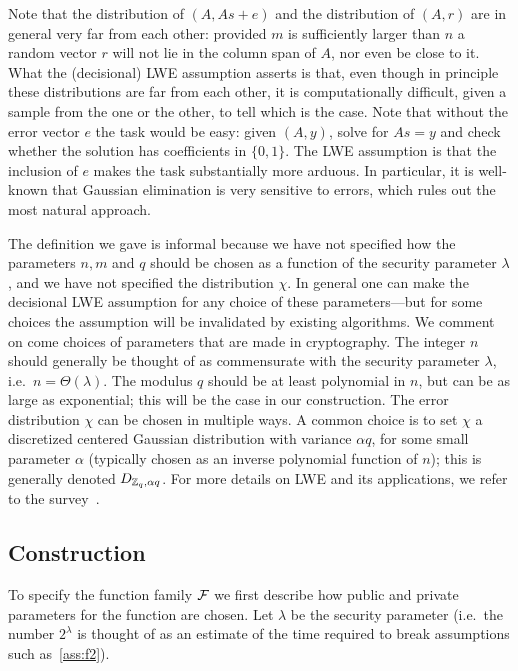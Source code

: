 Note that the distribution of $(A,As+e)$ and the distribution of $(A,r)$ are in general very far from each other: provided $m$ is sufficiently larger than $n$ a random vector $r$ will not lie in the column span of $A$, nor even be close to it. What the (decisional) LWE assumption asserts is that, even though in principle these distributions are far from each other, it is computationally difficult, given a sample from the one or the other, to tell which is the case.  Note that without the error vector $e$ the task would be easy: given $(A,y)$, solve for $As=y$ and check whether the solution has coefficients in $\{0,1\}$. The LWE assumption is that the inclusion of $e$ makes the task substantially more arduous. In particular, it is well-known that Gaussian elimination is very sensitive to errors, which rules out the most natural approach. 

The definition we gave is informal because we have not specified how the parameters $n,m$ and $q$ should be chosen as a function of the security parameter $\lambda$, and we have not specified the distribution $\chi$. In general one can make the decisional LWE assumption for any choice of these parameters---but for some choices the assumption will be invalidated by existing algorithms. We comment on come choices of parameters that are made in cryptography. The integer $n$ should generally be thought of as commensurate with the security parameter $\lambda$, i.e.\ $n=\Theta(\lambda)$. The modulus $q$ should be at least polynomial in $n$, but can be as large as exponential; this will be the case in our construction. The error distribution $\chi$ can be chosen in multiple ways. A common choice is to set $\chi$ a discretized centered Gaussian distribution with variance $\alpha q$, for some small parameter $\alpha$ (typically chosen as an inverse polynomial function of $n$); this is generally denoted $D_{\mathbb{Z}_q,\alpha q}$. For more details on LWE and its applications, we refer to the survey~\cite{peikert2016decade}. 

\subsection{Construction}
\label{sec:lwe-construction}

To specify the function family $\mathcal{F}$ we first describe how public and private parameters for the function are chosen. Let $\lambda$ be the security parameter (i.e.\ the number $2^\lambda$ is thought of as an estimate of the time required to break assumptions such as~\ref{ass:f2}). 

